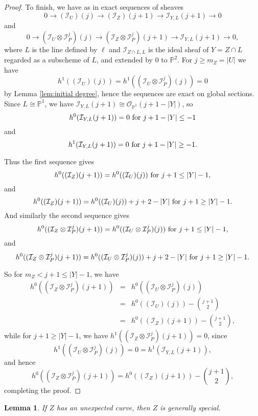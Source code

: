 \documentclass[12pt]{amsart}
\numberwithin{equation}{section}
\newtheorem{lemma}[theorem]{Lemma}
\theoremstyle{definition}
\begin{document}
\begin{proof}
To finish, we have as in \cite[(1.2.3)]{CHT} exact sequences of sheaves
$$ 0\to (\mathcal I_U)(j)\to (\mathcal I_Z)(j+1)\to \mathcal I_{Y, L}(j+1)\to 0$$
and
$$ 0\to (\mathcal I_U \otimes \mathcal I_P^j)(j)\to (\mathcal I_Z \otimes \mathcal I_P^j)(j+1)\to \mathcal I_{Y, L}(j+1)\to 0,$$
where $L$ is the line defined by $\ell$ and $\mathcal I_{Z\cap L, L}$ is the ideal sheaf of $Y=Z\cap L$ regarded as a subscheme of $L$,
and extended by 0 to ${ \ensuremath{\mathbb{P}}}^2$. 
For $j\geq m_Z=|U|$ we have 
\[
h^1((\mathcal I_U)(j))=h^1((\mathcal I_U \otimes \mathcal I_P^j)(j))=0
\]
by Lemma \ref{lem:initial degree}, hence the sequences are exact on
global sections. Since $L\cong { \ensuremath{\mathbb{P}}}^1$, we have $\mathcal I_{Y, L}(j+1)\cong \mathcal O_{{ \ensuremath{\mathbb{P}}}^1}(j+1-|Y|)$,
so 
\[
h^0(\mathcal I_{Y, L}(j+1))=0 \hbox{ for } j+1-|Y|\leq -1 
\]
and 
\[
h^1(\mathcal I_{Y, L}(j+1))=0 \hbox{ for } j+1-|Y| \geq -1.
\]

Thus the first sequence gives 
\[
h^0((\mathcal I_Z)(j+1)) = h^0((\mathcal I_U)(j)) \hbox{ for } j+1\leq |Y|-1, 
\]
and 
\[
h^0((\mathcal I_Z)(j+1)) = h^0((\mathcal I_U)(j))+j+2-|Y| \hbox{ for } j+1 \geq |Y|-1.
\]
And similarly the second sequence gives
\[
h^0((\mathcal I_Z \otimes \mathcal I_P^j)(j+1)) = h^0((\mathcal I_U \otimes \mathcal I_P^j)(j)) \hbox{ for } j+1 \leq |Y|-1, 
\]
and 
\[
h^0((\mathcal I_Z \otimes \mathcal I_P^j)(j+1)) = h^0((\mathcal I_U \otimes \mathcal I_P^j)(j))+j+2-|Y| \hbox{ for } j+1\geq |Y|-1.
\]

So for $m_Z<j+1\leq |Y|-1$, we have 
\[
\begin{array}{rcl}
h^0((\mathcal I_Z \otimes \mathcal I_P^j)(j+1)) & = & h^0((\mathcal I_U \otimes \mathcal I_P^j)(j)) \\
& =
& h^0((\mathcal I_U)(j))-\binom{j+1}{2} \\ 
& = & h^0((\mathcal I_Z)(j+1))-\binom{j+1}{2},
\end{array}
\]
while for $j+1\geq |Y|-1$, we have $h^1((\mathcal I_Z \otimes \mathcal I_P^j)(j+1))=0$,
since 
\[
h^1((\mathcal I_U \otimes \mathcal I_P^j)(j))  = 0 = h^1(\mathcal I_{Y, L}(j+1)),
\]
and hence
\[
h^0((\mathcal I_Z \otimes \mathcal I_P^j)(j+1)) = h^0((\mathcal I_Z)(j+1))-\binom{j+1}{2},
\]
completing the proof.
\end{proof}

\begin{lemma}\label{UnexpImpliesGenSpec}
If $Z$ has an unexpected curve, then $Z$ is generally special.
\end{lemma}
\end{document}
